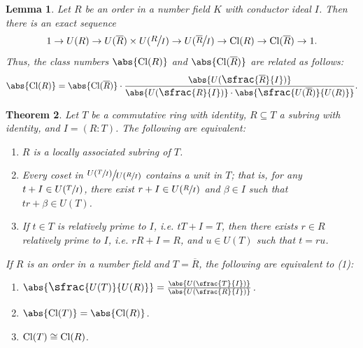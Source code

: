 \documentclass[12pt]{amsart}
\newtheorem{theorem}{Theorem}[section]
\newtheorem{lemma}[theorem]{Lemma}
\theoremstyle{definition}
\newcommand{\Rbar}{\overline{R}}
\newcommand{\Cl}{\textup{Cl}}
\newcommand{\quot}[2]{\large\sfrac{#1}{#2}\normalsize}
\begin{document}
	\begin{lemma}
		\label{exact sequence}
		Let $R$ be an order in a number field $K$ with conductor ideal $I$. Then there is an exact sequence
		$$1\to U(R)\to U(\Rbar)\times U(\quot{R}{I})\to U(\quot{\Rbar}{I})\to \Cl(R)\to \Cl(\Rbar)\to 1.$$
		Thus, the class numbers $\abs{\Cl(R)}$ and $\abs{\Cl(\Rbar)}$ are related as follows:
		$$\abs{\Cl(R)}=\abs{\Cl(\Rbar)}\cdot \frac{\abs{U(\quot{\Rbar}{I})}}{\abs{U(\quot{R}{I})}\cdot \abs{\quot{U(\Rbar)}{U(R)}}}.$$
	\end{lemma}
	
	\begin{theorem}
		\label{la equiv conditions}
		Let $T$ be a commutative ring with identity, $R\subseteq T$ a subring with identity, and $I=(R:T)$. The following are equivalent:
		\begin{enumerate}
			\item $R$ is a locally associated subring of $T$.
			\item Every coset in $\quot{U(\sfrac{T}{I})}{U(\sfrac{R}{I})}$ contains a unit in $T$; that is, for any $t+I\in U(\sfrac{T}{I})$, there exist $r+I\in U(\sfrac{R}{I})$ and $\beta\in I$ such that $tr+\beta\in U(T)$.
			\item If $t\in T$ is relatively prime to $I$, i.e. $tT+I=T$, then there exists $r\in R$ relatively prime to $I$, i.e. $rR+I=R$, and $u\in U(T)$ such that $t=ru$.
		\end{enumerate}
		If $R$ is an order in a number field and $T=\Rbar$, the following are equivalent to (1):
		\begin{enumerate}
			\item[(4)] $\abs{\quot{U(T)}{U(R)}}=\frac{\abs{U(\quot{T}{I})}}{\abs{U(\quot{R}{I})}}$.
			\item[(5)] $\abs{\Cl(T)}=\abs{\Cl(R)}$.
			\item[(6)] $\Cl(T)\cong\Cl(R)$.
		\end{enumerate}
	\end{theorem}
	
\end{document}
